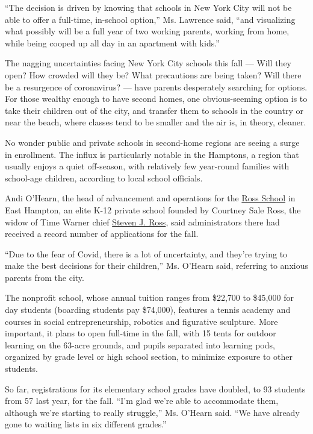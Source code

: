 ``The decision is driven by knowing that schools in New York City will
not be able to offer a full-time, in-school option,'' Ms. Lawrence said,
``and visualizing what possibly will be a full year of two working
parents, working from home, while being cooped up all day in an
apartment with kids.''

The nagging uncertainties facing New York City schools this fall ---
Will they open? How crowded will they be? What precautions are being
taken? Will there be a resurgence of coronavirus? --- have parents
desperately searching for options. For those wealthy enough to have
second homes, one obvious-seeming option is to take their children out
of the city, and transfer them to schools in the country or near the
beach, where classes tend to be smaller and the air is, in theory,
cleaner.

No wonder public and private schools in second-home regions are seeing a
surge in enrollment. The influx is particularly notable in the Hamptons,
a region that usually enjoys a quiet off-season, with relatively few
year-round families with school-age children, according to local school
officials.

Andi O'Hearn, the head of advancement and operations for the
\href{https://www.ross.org/}{Ross School} in East Hampton, an elite K-12
private school founded by Courtney Sale Ross, the widow of Time Warner
chief
\href{https://www.nytimes3xbfgragh.onion/1992/12/21/obituaries/the-creator-of-time-warner-steven-j-ross-is-dead-at-65.html}{Steven
J. Ross}, said administrators there had received a record number of
applications for the fall.

``Due to the fear of Covid, there is a lot of uncertainty, and they're
trying to make the best decisions for their children,'' Ms. O'Hearn
said, referring to anxious parents from the city.

The nonprofit school, whose annual tuition ranges from \$22,700 to
\$45,000 for day students (boarding students pay \$74,000), features a
tennis academy and courses in social entrepreneurship, robotics and
figurative sculpture. More important, it plans to open full-time in the
fall, with 15 tents for outdoor learning on the 63-acre grounds, and
pupils separated into learning pods, organized by grade level or high
school section, to minimize exposure to other students.

So far, registrations for its elementary school grades have doubled, to
93 students from 57 last year, for the fall. ``I'm glad we're able to
accommodate them, although we're starting to really struggle,'' Ms.
O'Hearn said. ``We have already gone to waiting lists in six different
grades.''

